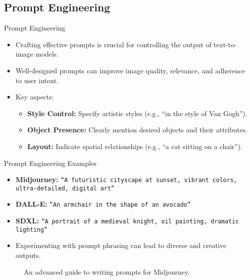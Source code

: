 \subsection{Prompt Engineering}
\begin{frame}[allowframebreaks]{Prompt Engineering}
    \begin{itemize}
        \item Crafting effective prompts is crucial for controlling the output of text-to-image models.
        \item Well-designed prompts can improve image quality, relevance, and adherence to user intent.
        \item Key aspects:
        \begin{itemize}
            \item \textbf{Style Control:} Specify artistic styles (e.g., ``in the style of Van Gogh'').
            \item \textbf{Object Presence:} Clearly mention desired objects and their attributes.
            \item \textbf{Layout:} Indicate spatial relationships (e.g., ``a cat sitting on a chair'').
        \end{itemize}
    \end{itemize}
\framebreak
    \begin{figure}
        \centering
    \end{figure}
\end{frame}

\begin{frame}[allowframebreaks]{Prompt Engineering Examples}
    \begin{itemize}
        \item \textbf{Midjourney:} \texttt{``A futuristic cityscape at sunset, vibrant colors, ultra-detailed, digital art''}
        \item \textbf{DALL-E:} \texttt{``An armchair in the shape of an avocado''}
        \item \textbf{SDXL:} \texttt{``A portrait of a medieval knight, oil painting, dramatic lighting''}
    \end{itemize}
    \vspace{1em}
    \begin{itemize}
        \item Experimenting with prompt phrasing can lead to diverse and creative outputs.
    \end{itemize}
\framebreak
    \begin{figure}
        \centering
        \caption*{An advanced guide to writing prompts for Midjourney.}
    \end{figure}
\end{frame}

